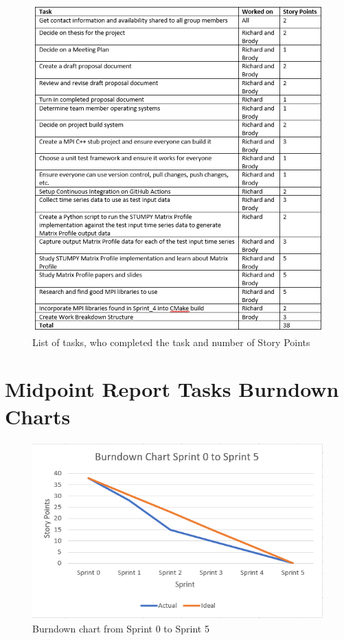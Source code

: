 \documentclass[conference]{IEEEtran}
\begin{document}
\begin{figure}
\begin{center}
\includegraphics[scale=0.75]{tasks.png}
\caption{List of tasks, who completed the task and number of Story Points}
\end{center}
\end{figure}

\section{Midpoint Report Tasks Burndown Charts}


\begin{figure}
\begin{center}
\includegraphics[scale=0.75]{Burndown.png}
\caption{Burndown chart from Sprint 0 to Sprint 5}
\end{center}
\end{figure}
\end{document}
